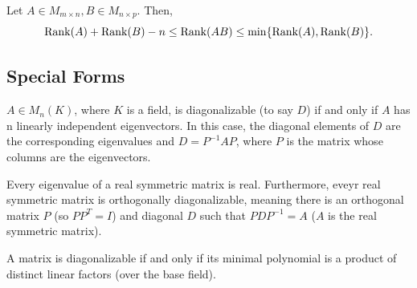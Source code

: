 \begin{proposition}
Let $A \in M_{m \times n}, B \in M_{n \times p}$. Then, 
\[
\mathrm{Rank}(A) + \mathrm{Rank}(B) - n \leq \mathrm{Rank}(AB) \leq \min\{\mathrm{Rank}(A), \mathrm{Rank}(B)\}.
\]
\end{proposition}

\subsection{Special Forms}

\begin{theorem}[Diagonalizability]
$A \in M_n(K)$, where $K$ is a field, is diagonalizable (to say $D$) if and only if 
$A$ has n linearly independent eigenvectors. In this case, the diagonal 
elements of $D$ are the corresponding eigenvalues and 
$D = P^{-1}A{P}$, where $P$ is the matrix whose columns are the eigenvectors.
\end{theorem}

\begin{theorem}
Every eigenvalue of a real symmetric matrix is real.
Furthermore, eveyr real symmetric matrix is orthogonally diagonalizable, meaning 
there is an orthogonal matrix $P$ (so $PP^T = I$) and diagonal $D$ 
such that $PDP^{-1} = A$ ($A$ is the real symmetric matrix).
\end{theorem}

\begin{theorem}
A matrix is diagonalizable if and only if its minimal polynomial is a product of 
distinct linear factors (over the base field).
\end{theorem}

